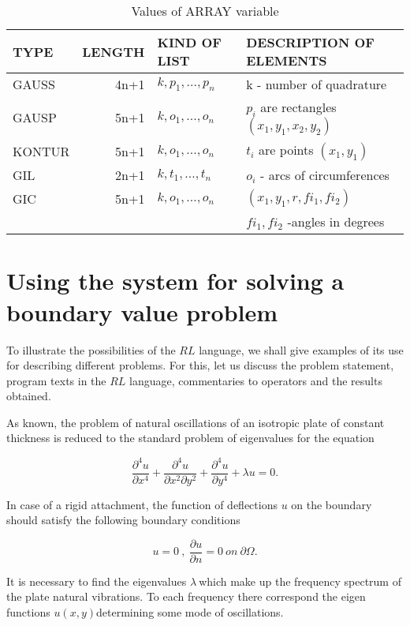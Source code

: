 {\begin{table}
  \begin{center}
  \begin{tabular}{|l|r|l|l|} \hline
 {TYPE} & {LENGTH} & {KIND OF LIST} & {DESCRIPTION OF ELEMENTS} \\ \hline
 GAUSS  & 4n+1 & $k,p_1,...,p_n$ & k - number of quadrature    \\
 GAUSP  & 5n+1 & $k,o_1,...,o_n$ & $p_i$ are rectangles $(x_1,y_1,x_2,y_2)$  \\
 KONTUR & 5n+1 & $k,o_1,...,o_n$ & $t_i$ are points $(x_1,y_1)$   \\
 GIL    & 2n+1 & $k,t_1,...,t_n$ & $o_i$ - arcs of circumferences  \\
 GIC    & 5n+1 & $k,o_1,...,o_n$ & $(x_1,y_1,r,fi_1,fi_2)$      \\
        &      &                 & $fi_1,fi_2$ -angles in degrees \\ \hline
  \end{tabular}
  \end{center}
  \caption{Values of ARRAY variable\label{t5}}
\end{table}}

\section{Using the system for solving a boundary value problem}

To illustrate the possibilities of the $RL$ language, we shall give examples
of its use for describing different problems. For this, let us discuss the
problem statement, program texts in the $RL$ language, commentaries to
operators and the results obtained.

As known, the problem of natural oscillations of an isotropic plate of
constant thickness is reduced to the standard problem of eigenvalues for the
equation

$$
\frac{\partial ^4u}{\partial x^4}+\frac{\partial ^4u}{\partial x^2\partial
y^2}+\frac{\partial ^4u}{\partial y^4}+\lambda u=0. 
$$

In case of a rigid attachment, the function of deflections $u$ on the
boundary should satisfy the following boundary conditions

$$
u=0\ ,\ \frac{\partial u}{\partial n}=0\ on\ \partial \Omega . 
$$

It is necessary to find the eigenvalues $\lambda \ $which make up the
frequency spectrum of the plate natural vibrations. To each frequency there
correspond the eigen functions $u\left( x,y\right) $determining some mode of
oscillations.

